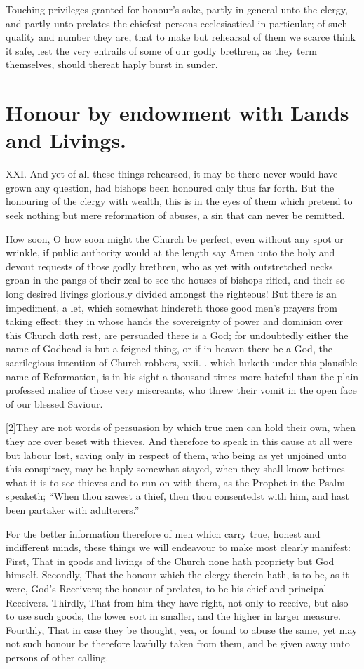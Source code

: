 Touching privileges granted for honour’s sake, partly in general unto the clergy, and partly unto prelates the chiefest persons ecclesiastical in particular; of such quality and number they are, that to make but rehearsal of them we scarce think it safe, lest the very entrails of some of our godly brethren, as they term themselves, should thereat haply burst in sunder.

\section*{Honour by endowment with Lands and Livings.}

XXI. And yet of all these things rehearsed, it may be there never would have grown any question, had bishops been honoured only thus far forth. But the honouring of the clergy with wealth, this is in the eyes of them which pretend to seek nothing but mere reformation of abuses, a sin that can never be remitted.

How soon, O how soon might the Church be perfect, even without any spot or wrinkle, if public authority would at the length say Amen unto the holy and devout requests of those godly brethren, who as yet with outstretched necks groan in the pangs of their zeal to see the houses of bishops rifled, and their so long desired livings gloriously divided amongst the righteous! But there is an impediment, a let, which somewhat hindereth those good men’s prayers from taking effect: they in whose hands the sovereignty of power and dominion over this Church doth rest, are persuaded there is a God; for undoubtedly either the name of Godhead is but a feigned thing, or if in heaven there be a God, the sacrilegious intention  of Church robbers, xxii. . which lurketh under this plausible name of Reformation, is in his sight a thousand times more hateful than the plain professed malice of those very miscreants, who threw their vomit in the open face of our blessed Saviour.

[2]They are not words of persuasion by which true men can hold their own, when they are over beset with thieves. And therefore to speak in this cause at all were but labour lost, saving only in respect of them, who being as yet unjoined unto this conspiracy, may be haply somewhat stayed, when they shall know betimes what it is to see thieves and to run on with them, as the Prophet in the Psalm speaketh; “When thou sawest a thief, then thou consentedst with him, and hast been partaker with adulterers.”

For the better information therefore of men which carry true, honest and indifferent minds, these things we will endeavour to make most clearly manifest: First, That in goods and livings of the Church none hath propriety but God himself. Secondly, That the honour which the clergy therein hath, is to be, as it were, God’s Receivers; the honour of prelates, to be his chief and principal Receivers. Thirdly, That from him they have right, not only to receive, but also to use such goods, the lower sort in smaller, and the higher in larger measure. Fourthly, That in case they be thought, yea, or found to abuse the same, yet may not such honour be therefore lawfully taken from them, and be given away unto persons of other calling.

